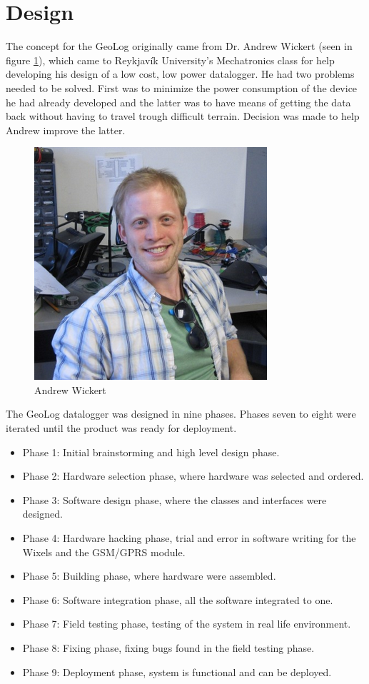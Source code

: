 \section{Design}
The concept for the GeoLog originally came from Dr. Andrew Wickert (seen in figure 
\ref{fig:andrewWickert}), which came to Reykjavík University's Mechatronics class for 
help developing his design of a low cost, low power datalogger\cite{ALog-BottleLogger}. 
He had two problems needed to be solved. First was to minimize the power consumption of the device he had already developed and the latter was to have means of getting the data
back without having to travel trough difficult terrain. Decision was made to help Andrew 
improve the latter.

\begin{figure}
\centering
\includegraphics[width=0.4\linewidth]{graphics/andrewWickert}
\caption{Andrew Wickert\label{fig:andrewWickert}\cite{andrewWickert}}
\end{figure}

The GeoLog datalogger was designed in nine phases. Phases seven to eight were iterated
until the product was ready for deployment.

\begin{itemize}
	\item{Phase 1:} Initial brainstorming and high level design phase.
	\item{Phase 2:} Hardware selection phase, where hardware was selected and ordered.
	\item{Phase 3:} Software design phase, where the classes and interfaces were designed.
	\item{Phase 4:} Hardware hacking phase, trial and error in software writing for the
					Wixels\cite{wixel} and the GSM/GPRS module\cite{SM5100B}.
	\item{Phase 5:} Building phase, where hardware were assembled.
	\item{Phase 6:} Software integration phase, all the software integrated to one.
	\item{Phase 7:} Field testing phase, testing of the system in real life environment.
	\item{Phase 8:} Fixing phase, fixing bugs found in the field testing phase.
	\item{Phase 9:} Deployment phase, system is functional and can be deployed. 
\end{itemize}

